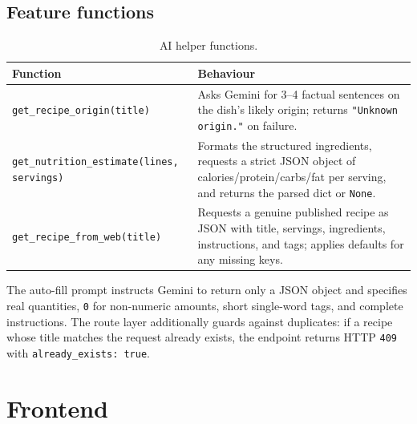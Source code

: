 \documentclass[11pt,a4paper]{article}
\newcommand{\code}[1]{\texttt{#1}}
\begin{document}
\subsection{Feature functions}
\begin{table}[h]
\centering
\small
\begin{tabularx}{\textwidth}{@{}lX@{}}
\toprule
\textbf{Function} & \textbf{Behaviour} \\
\midrule
\code{get\_recipe\_origin(title)} & Asks Gemini for 3--4 factual sentences on the dish's likely origin; returns \code{"Unknown origin."} on failure. \\
\code{get\_nutrition\_estimate(lines, servings)} & Formats the structured ingredients, requests a strict JSON object of calories/protein/carbs/fat per serving, and returns the parsed dict or \code{None}. \\
\code{get\_recipe\_from\_web(title)} & Requests a genuine published recipe as JSON with title, servings, ingredients, instructions, and tags; applies defaults for any missing keys. \\
\bottomrule
\end{tabularx}
\caption{AI helper functions.}
\end{table}

The auto-fill prompt instructs Gemini to return only a JSON object and specifies
real quantities, \code{0} for non-numeric amounts, short single-word tags, and
complete instructions. The route layer additionally guards against duplicates:
if a recipe whose title matches the request already exists, the endpoint returns
HTTP \code{409} with \code{already\_exists: true}.

\section{Frontend}
\end{document}
